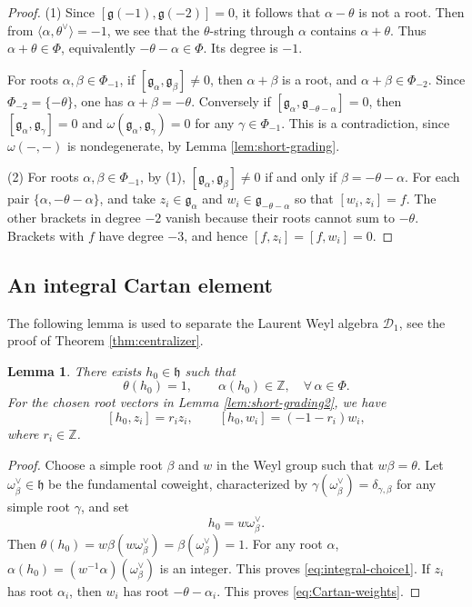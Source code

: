 \documentclass[12pt,a4paper]{amsart}
\numberwithin{equation}{section}
\newtheorem{lemma}[theorem]{Lemma}
\theoremstyle{definition}
\theoremstyle{remark}
\newcommand{\g}{\mathfrak g}
\newcommand{\h}{\mathfrak h}
\newcommand{\D}{\mathcal D}
\newcommand{\Z}{\mathbb Z}
\begin{document}
\begin{proof}

(1) Since $[\g(-1),\g(-2)]=0$, it follows that $\alpha-\theta$ is not a root.
Then from $\langle\alpha,\theta^\vee\rangle=-1$,  we see that the $\theta$-string through $\alpha$ contains $\alpha+\theta$.  Thus $\alpha+\theta\in\Phi$, equivalently $-\theta-\alpha\in\Phi$.  Its degree is $-1$.

For  roots  $\alpha, \beta\in \Phi_{-1}$, if $[\g_\alpha,\g_\beta]\neq 0$, then $\alpha+\beta$ is a root, and $\alpha+\beta\in \Phi_{-2}$.  Since $\Phi_{-2}=\{-\theta\}$, one has $\alpha+\beta=-\theta$.  Conversely if $[\g_\alpha,\g_{-\theta-\alpha}]=0$, then $[\g_\alpha,\g_\gamma]=0$ and $\omega(\g_\alpha, \g_\gamma)=0$ for any $\gamma\in \Phi_{-1}$. This is a contradiction, since
$\omega(-,-)$ is nondegenerate, by Lemma \ref{lem:short-grading}.

(2) For  roots  $\alpha, \beta\in \Phi_{-1}$, by
 (1), $[\g_\alpha,\g_\beta]\neq 0$ if and only if $\beta=-\theta-\alpha$.
For each pair
\(\{\alpha,-\theta-\alpha\}\), and take \(z_i\in \g_\alpha\) and \(w_i \in\g_{-\theta-\alpha}\)  so that
\([w_i,z_i]=f\).
The other brackets in degree \(-2\) vanish because their roots
cannot sum to \(-\theta\).
Brackets with \(f\) have degree \(-3\), and hence  $[f,z_i]=[f,w_i]=0$.
\end{proof}

\subsection{An integral Cartan element}
\label{subsec:cartan-element}

The following lemma is used  to separate the Laurent Weyl algebra $\D_1$, see the proof of Theorem \ref{thm:centralizer}.

\begin{lemma}\label{lem:integral-Cartan}
There  exists
\(h_0\in\h\) such that
\begin{equation}\label{eq:integral-choice1}
  \theta(h_0)=1, \qquad \alpha(h_0)\in\Z,\quad \forall\,\alpha\in\Phi.
\end{equation}
For the chosen root vectors in Lemma \ref{lem:short-grading2}, we have
\begin{equation}\label{eq:Cartan-weights}
 [h_0,z_i]=r_i z_i,\qquad
 [h_0,w_i]=(-1-r_i)w_i,
\end{equation} where $r_i\in\Z$.
\end{lemma}

\begin{proof}
Choose a simple root \(\beta\) and \(w\) in the Weyl group such that
\(w\beta=\theta\). Let \(\omega_\beta^\vee\in\h\) be the fundamental
coweight, characterized by
\(\gamma(\omega_\beta^\vee)=\delta_{\gamma,\beta}\) for any simple root $\gamma$, and set
\[
 h_0=w\omega_\beta^\vee.
\]
Then \(\theta(h_0)=w\beta(w\omega_\beta^\vee)=\beta(\omega_\beta^\vee)=1\). For any root \(\alpha\),
\(\alpha(h_0)=(w^{-1}\alpha)(\omega_\beta^\vee)\) is an integer.
This proves \eqref{eq:integral-choice1}.
If \(z_i\) has root \(\alpha_i\), then \(w_i\) has root
\(-\theta-\alpha_i\). This proves
\eqref{eq:Cartan-weights}.
\end{proof}
\end{document}
